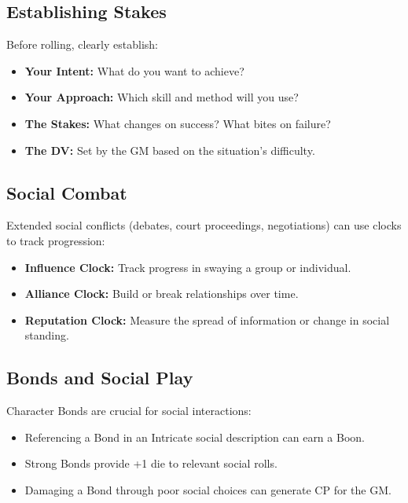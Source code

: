 \subsection*{Establishing Stakes}

Before rolling, clearly establish:
\begin{itemize}
  \item \textbf{Your Intent:} What do you want to achieve?
  \item \textbf{Your Approach:} Which skill and method will you use?
  \item \textbf{The Stakes:} What changes on success? What bites on failure?
  \item \textbf{The DV:} Set by the GM based on the situation's difficulty.
\end{itemize}

\subsection*{Social Combat}

Extended social conflicts (debates, court proceedings, negotiations) can use clocks to track progression:
\begin{itemize}
  \item \textbf{Influence Clock:} Track progress in swaying a group or individual.
  \item \textbf{Alliance Clock:} Build or break relationships over time.
  \item \textbf{Reputation Clock:} Measure the spread of information or change in social standing.
\end{itemize}

\subsection*{Bonds and Social Play}

Character Bonds are crucial for social interactions:
\begin{itemize}
  \item Referencing a Bond in an Intricate social description can earn a Boon.
  \item Strong Bonds provide +1 die to relevant social rolls.
  \item Damaging a Bond through poor social choices can generate CP for the GM.
\end{itemize}


